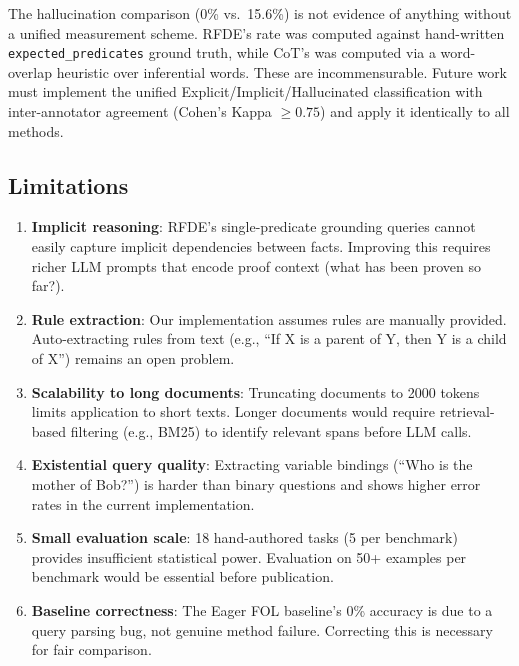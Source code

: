 \documentclass[11pt,letterpaper]{article}
\begin{document}
The hallucination comparison (0\% vs.\ 15.6\%) is not evidence of anything without a unified
measurement scheme. RFDE's rate was computed against hand-written \texttt{expected\_predicates}
ground truth, while CoT's was computed via a word-overlap heuristic over inferential words.
These are incommensurable. Future work must implement the unified Explicit/Implicit/Hallucinated
classification with inter-annotator agreement (Cohen's Kappa $\geq 0.75$) and apply it
identically to all methods.

\subsection{Limitations}

\begin{enumerate}
  \item \textbf{Implicit reasoning}: RFDE's single-predicate grounding queries cannot easily
    capture implicit dependencies between facts. Improving this requires richer LLM prompts
    that encode proof context (what has been proven so far?).

  \item \textbf{Rule extraction}: Our implementation assumes rules are manually provided.
    Auto-extracting rules from text (e.g., ``If X is a parent of Y, then Y is a child of X'')
    remains an open problem.

  \item \textbf{Scalability to long documents}: Truncating documents to 2000 tokens limits
    application to short texts. Longer documents would require retrieval-based filtering
    (e.g., BM25) to identify relevant spans before LLM calls.

  \item \textbf{Existential query quality}: Extracting variable bindings (``Who is the mother
    of Bob?'') is harder than binary questions and shows higher error rates in the current
    implementation.

  \item \textbf{Small evaluation scale}: 18 hand-authored tasks (5 per benchmark) provides
    insufficient statistical power. Evaluation on 50+ examples per benchmark would be essential
    before publication.

  \item \textbf{Baseline correctness}: The Eager FOL baseline's 0\% accuracy is due to a
    query parsing bug, not genuine method failure. Correcting this is necessary for fair
    comparison.
\end{enumerate}
\end{document}
